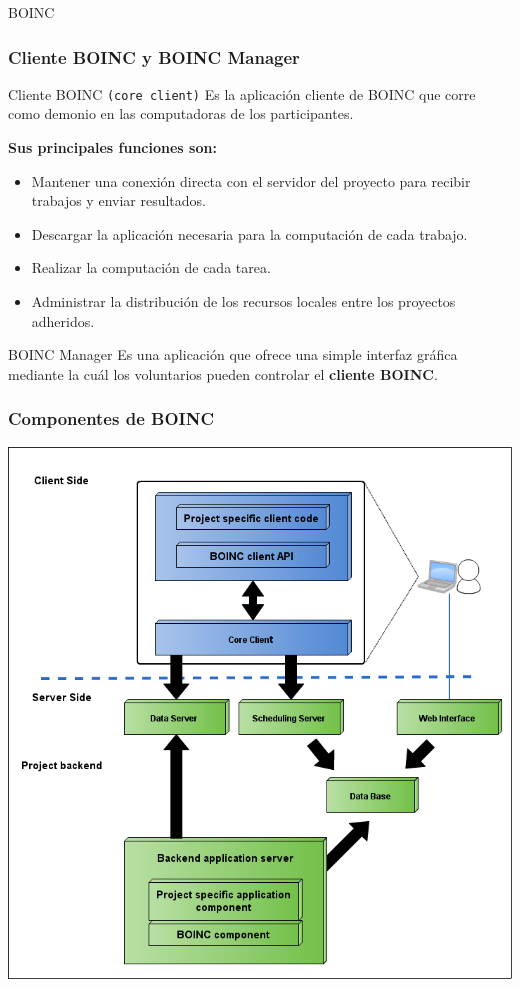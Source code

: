 \begin{subsection}{BOINC}
	\begin{frame}\frametitle{Cliente BOINC y BOINC Manager}
		\begin{block}{Cliente BOINC \texttt{(core client)}}
			Es la aplicación cliente de BOINC que corre como demonio en las computadoras de los participantes.
		\end{block}	
		\pause
		\textbf{Sus principales funciones son:}
		\begin{itemize}
			\item Mantener una conexión directa con el servidor del proyecto para recibir trabajos y enviar resultados.
			\item Descargar la aplicación necesaria para la computación de cada trabajo.
			\item Realizar la computación de cada tarea.
			\item Administrar la distribución de los recursos locales entre los proyectos adheridos.
		\end{itemize}
		\pause
		\vspace{2mm}
		\begin{block}{BOINC Manager}
			Es una aplicación que ofrece una simple interfaz gráfica mediante la cuál los voluntarios pueden controlar el 
			\textbf{cliente BOINC}.
		\end{block}	
	\end{frame}

	\begin{frame}\frametitle{Componentes de BOINC}
		\begin{center}
			\includegraphics[scale=0.25]{images/componentes-boinc.png}
		\end{center}
	\end{frame}


\end{subsection}
